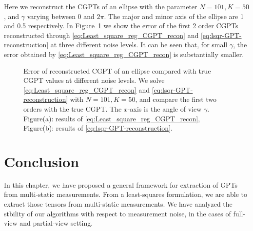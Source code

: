 Here we reconstruct the CGPTs of an ellipse with the parameter
$N=101, K=50$, and $\gamma$ varying between 0 and $2\pi$.  The
major and minor axis of the ellipse are 1 and 0.5 respectively. In
Figure~\ref{fig:cgpt_lim_aov} we show the error of the first 2 order
CGPTs reconstructed through \eqref{eq:Least_square_reg_CGPT_recon}
and \eqref{eq:lsqr-GPT-reconstruction} at three different noise
levels. It can be seen that, for small $\gamma$, the error
obtained by \eqref{eq:Least_square_reg_CGPT_recon} is
substantially smaller.

\begin{figure}[htp]
  \centering
  \caption{Error of reconstructed CGPT of an ellipse compared with true CGPT values at different
    noise levels. We solve \eqref{eq:Least_square_reg_CGPT_recon} and
    \eqref{eq:lsqr-GPT-reconstruction} with $N=101, K=50$, and compare the first two orders with the
    true CGPT. The $x$-axis is the angle of view $\gamma$. Figure(a): results of
    \eqref{eq:Least_square_reg_CGPT_recon}, Figure(b): results of \eqref{eq:lsqr-GPT-reconstruction}.}
  \label{fig:cgpt_lim_aov}
\end{figure}

\section{Conclusion}

In this chapter, we have proposed a general framework for extraction of GPTs from
multi-static measurements.
From a least-squares formulation, we are able to extract those tensors from
multi-static measurements. We have analyzed the stbility of our algorithms with
respect to measurement noise, in the cases of full-view and partial-view setting.